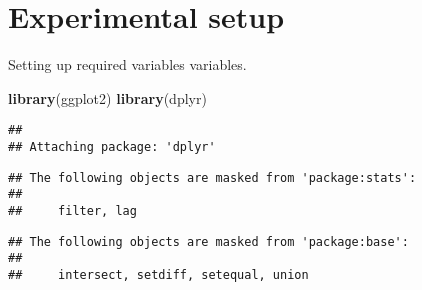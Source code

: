 \documentclass[]{book}
\newenvironment{Shaded}{\begin{snugshade}}{\end{snugshade}}
\newcommand{\KeywordTok}[1]{\textcolor[rgb]{0.13,0.29,0.53}{\textbf{#1}}}
\newcommand{\NormalTok}[1]{#1}
\begin{document}
\hypertarget{experimental-setup}{%
\section{Experimental setup}\label{experimental-setup}}

Setting up required variables variables.

\begin{Shaded}
\begin{Highlighting}[]
\KeywordTok{library}\NormalTok{(ggplot2)}
\KeywordTok{library}\NormalTok{(dplyr)}
\end{Highlighting}
\end{Shaded}

\begin{verbatim}
## 
## Attaching package: 'dplyr'
\end{verbatim}

\begin{verbatim}
## The following objects are masked from 'package:stats':
## 
##     filter, lag
\end{verbatim}

\begin{verbatim}
## The following objects are masked from 'package:base':
## 
##     intersect, setdiff, setequal, union
\end{verbatim}
\end{document}
